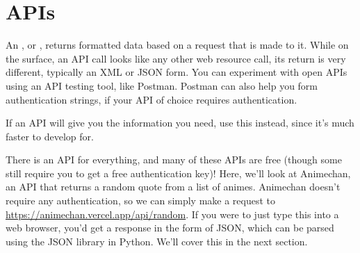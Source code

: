 \section{APIs}
An , or , returns formatted data based on a request that is made to it. While on the surface, an API call looks like any other web resource call, its return is very different, typically an XML or JSON form. You can experiment with open APIs using an API testing tool, like Postman. Postman can also help you form authentication strings, if your API of choice requires authentication.\par
If an API will give you the information you need, use this instead, since it's much faster to develop for.\par
There is an API for everything, and many of these APIs are free (though some still require you to get a free authentication key)! Here, we'll look at Animechan, an API that returns a random quote from a list of animes. Animechan doesn't require any authentication, so we can simply make a request to \href{https://animechan.vercel.app/api/random}{https://animechan.vercel.app/api/random}. If you were to just type this into a web browser, you'd get a response in the form of JSON, which can be parsed using the JSON library in Python. We'll cover this in the next section.\par

